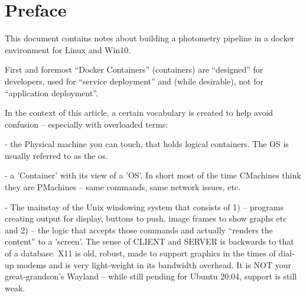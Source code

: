 \documentclass[letter,11pt,oneside]{article}
\newcommand{\dhl}[1]{{\color{verbcolor}{\texttt#1}}}
\begin{document}
\clearpage


\clearpage


 

\begin{multicols}{2}
  \tableofcontents
\end{multicols}

\listoffigures
\clearpage
{}

\section*{Preface}

This document contains notes about building a photometry pipeline in
a docker environment for Linux and Win10.

First and foremost ``Docker Containers'' (containers) are ``designed''
for developers, used for ``service deployment'' and (while desirable),
not for ``application deployment''.

In the context of this article, a certain vocabulary is created to
help avoid confusion -- especially with overloaded terms:

\dhl{PMachine} - the Physical machine you can touch, that holds logical
containers. The OS is usually referred to as the \dhl{host} os.

\dhl{CMachine} - a 'Container' with its view of a 'OS'. In short most
of the time CMachines think they are PMachines -- same commands,
same network issues, etc.

\dhl{X11} - The mainstay of the Unix windowing system that consists
of 1) \dhl{clients} -- programs creating output for display, buttons
to push, image frames to show graphs etc and 2) \dhl{servers} -- the
logic that accepts those commands and actually ``renders the content''
to a 'screen'. The sense of CLIENT and SERVER is backwards to that of
a database. X11 is old, robust, made to support graphics in the times
of dial-up modems and is very light-weight in its bandwidth overhead.
It is NOT your great-grandson's Wayland  -- while
still pending for Ubuntu 20.04, support is still weak.
\end{document}
